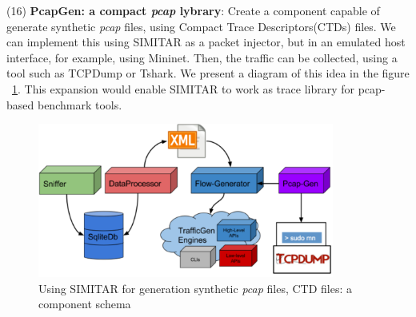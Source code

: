 (16) \textbf{PcapGen: a compact \textit{pcap} lybrary}: Create a component capable of generate synthetic \textit{pcap} files, using Compact Trace Descriptors(CTDs) files. We can implement this using SIMITAR as a packet injector, but in an emulated host interface, for example, using Mininet. Then, the traffic can be collected, using a tool such as TCPDump or Tshark. We present a diagram of this idea in the figure ~\ref{fig:pcap-gen}. This expansion would enable SIMITAR  to work as trace library for pcap-based benchmark tools.

\begin{figure}[!ht]
	\centering
	\includegraphics[height=2.0in]{figures/ch6/pcap-gen}
	\caption{Using SIMITAR for generation synthetic \textit{pcap} files, CTD files: a component schema}
	\label{fig:pcap-gen}
\end{figure}
	





